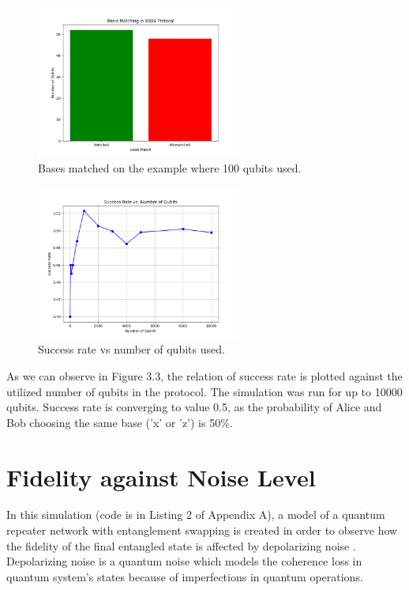 \documentclass[12pt,a4paper] {report}
\begin{document}
		\begin{figure}[h!]
			\centering
			\includegraphics[width=0.6\textwidth]{bb84/basis_matching.png}
			\caption{Bases matched on the example where 100 qubits used.}
			\label{fig:}
		\end{figure}		


		\begin{figure}[h!]
			\centering
			\includegraphics[width=0.6\textwidth]{bb84/success_rate_vs_num_qubits.png}
			\caption{Success rate vs number of qubits used.}
			\label{fig:}
		\end{figure}		

		As we can observe in Figure 3.3, the relation of success rate is plotted against the utilized 
		number of qubits in the protocol. The simulation was run for up to 10000 qubits. 
		Success rate is converging to value 0.5, as the probability 
		of Alice and Bob choosing the same base ('x' or 'z') is 50\%.

		\section{Fidelity against Noise Level}	
		
		In this simulation (code is in Listing 2 of Appendix A), a model of a quantum repeater network with
		entanglement swapping is created in order to observe how the fidelity of the final entangled state is
		affected by depolarizing noise \cite{depolarization}. Depolarizing noise is a quantum noise which models the
		coherence loss in quantum system's states because of imperfections in quantum operations.
		
\end{document}
